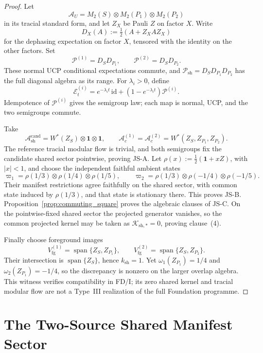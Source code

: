 \documentclass[12pt]{article}
\theoremstyle{definition}
\theoremstyle{remark}
\begin{document}
\begin{proof}
Let
\[
\mathcal A_U=M_2(S)\otimes M_2(P_1)\otimes M_2(P_2)
\]
in its tracial standard form, and let \(Z_X\) be Pauli \(Z\) on factor
\(X\). Write
\[
D_X(A):=\tfrac12(A+Z_XAZ_X)
\]
for the dephasing expectation on factor \(X\), tensored with the identity
on the other factors. Set
\[
\mathcal P^{(1)}=D_SD_{P_1},
\qquad
\mathcal P^{(2)}=D_SD_{P_2}.
\]
These normal UCP conditional expectations commute, and
\(\mathcal P_{\mathrm{sh}}=D_SD_{P_1}D_{P_2}\) has the full diagonal
algebra as its range. For \(\lambda_i>0\), define
\[
\mathcal E_t^{(i)}
=e^{-\lambda_i t}\,\mathrm{id}
+(1-e^{-\lambda_i t})\mathcal P^{(i)}.
\]
Idempotence of \(\mathcal P^{(i)}\) gives the semigroup law; each map is
normal, UCP, and the two semigroups commute.

Take
\[
\mathcal A_{\mathrm{sh}}^{\mathrm{cand}}
=W^*(Z_S)\otimes\mathbf1\otimes\mathbf1,
\qquad
\mathcal A_c^{(1)}=\mathcal A_c^{(2)}
=W^*(Z_S,Z_{P_1},Z_{P_2}).
\]
The reference tracial modular flow is trivial, and both semigroups fix
the candidate shared sector pointwise, proving JS-A. Let
\(\rho(x):=\tfrac12(\mathbf1+xZ)\), with \(|x|<1\), and choose the
independent faithful ambient states
\[
\varpi_1=\rho(1/3)\otimes\rho(1/4)\otimes\rho(1/5),
\qquad
\varpi_2=\rho(1/3)\otimes\rho(-1/4)\otimes\rho(-1/5).
\]
Their manifest restrictions agree faithfully on the shared sector, with
common state induced by \(\rho(1/3)\), and that state is stationary there.
This proves JS-B. Proposition~\ref{prop:commuting_square} proves the
algebraic clauses of JS-C. On the pointwise-fixed shared sector the
projected generator vanishes, so the common projected kernel may be
taken as \(\mathcal K_{\mathrm{sh},*}=0\), proving clause~(4).

Finally choose foreground images
\[
V_{\mathrm{fg}}^{(1)}=\operatorname{span}\{Z_S,Z_{P_1}\},
\qquad
V_{\mathrm{fg}}^{(2)}=\operatorname{span}\{Z_S,Z_{P_2}\}.
\]
Their intersection is \(\operatorname{span}\{Z_S\}\), hence
\(k_{\mathrm{sh}}=1\). Yet
\(\omega_1(Z_{P_1})=1/4\) and
\(\omega_2(Z_{P_1})=-1/4\), so the discrepancy is nonzero on the larger
overlap algebra. This witness verifies compatibility in FD/I; its zero
shared kernel and tracial modular flow are not a Type~III realization of
the full Foundation programme.
\end{proof}

\section{The Two-Source Shared Manifest Sector}\label{sec:two}
\end{document}
